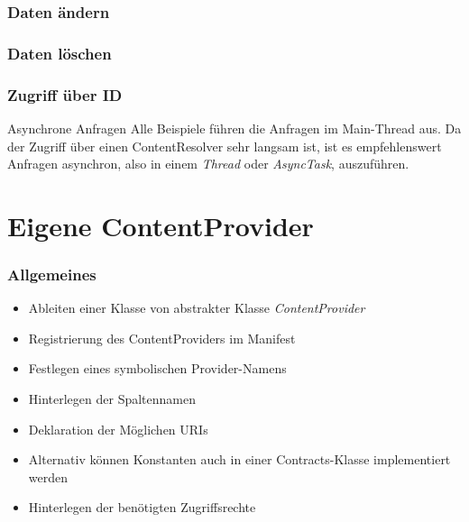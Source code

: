 \begin{frame}
   \frametitle{Daten ändern}
	
\end{frame}

\begin{frame}
   \frametitle{Daten löschen}
	
\end{frame}

\begin{frame}
   \frametitle{Zugriff über ID}
	
   
   \begin{alertblock}{Asynchrone Anfragen}
	Alle Beispiele führen die Anfragen im Main-Thread aus. Da der Zugriff 
	über einen ContentResolver sehr langsam ist, ist es empfehlenswert 
	Anfragen asynchron, also in einem \emph{Thread} oder \emph{AsyncTask}, auszuführen.
	\end{alertblock}
\end{frame}

\section{Eigene ContentProvider}
\begin{frame}
   \frametitle{Allgemeines}
   \begin{itemize}
   	\item Ableiten einer Klasse von abstrakter Klasse \emph{ContentProvider}
   	\item Registrierung des ContentProviders im Manifest
   	\item Festlegen eines symbolischen Provider-Namens
   	\item Hinterlegen der Spaltennamen
   	\item Deklaration der Möglichen URIs
   	\item Alternativ können Konstanten auch in einer Contracts-Klasse 
   		implementiert werden
   	\item Hinterlegen der benötigten Zugriffsrechte
   \end{itemize}
\end{frame}

